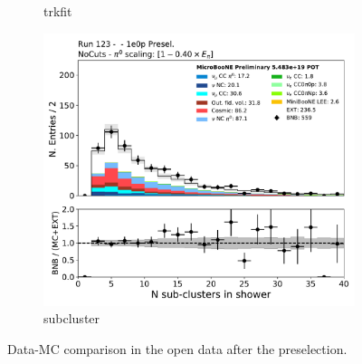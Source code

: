 \begin{figure}[H]
\begin{center}
\begin{subfigure}[b]{0.3\textwidth}
    \caption{\label{fig:1e0p:dataMCRun1:trkfit} trkfit }
    \end{subfigure}
    \begin{subfigure}[b]{0.3\textwidth}
    \centering
    \includegraphics[width=1.00\textwidth]{1e0p/dataMCRun123/subcluster.pdf}
    \caption{\label{fig:1e0p:dataMCRun1:subcluster} subcluster }
    \end{subfigure}
\caption{\label{fig:1e0p:dataMCRun1:numu1}Data-MC comparison in the open data after the \zpsel preselection.}
\end{center}
\end{figure}


